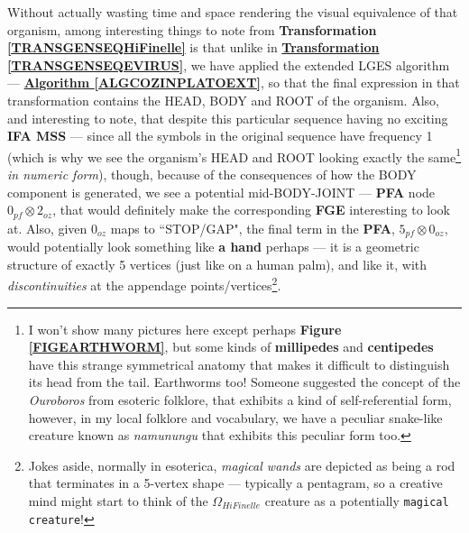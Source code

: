\documentclass[a4paper, 18pt]{book} %
\begin{document}
Without actually wasting time and space rendering the visual equivalence of that organism, among interesting things to note from \textbf{Transformation \ref{TRANSGENSEQHiFinelle}} is that unlike in \textbf{\hyperref[TRANSGENSEQEVIRUS]{Transformation \ref{TRANSGENSEQEVIRUS}}}, we have applied the extended LGES algorithm --- \textbf{\hyperref[ALGCOZINPLATOEXT]{Algorithm \ref{ALGCOZINPLATOEXT}}}, so that the final expression in that transformation contains the HEAD, BODY and ROOT of the organism. Also, and interesting to note, that despite this particular sequence having no exciting \textbf{IFA MSS} --- since all the symbols in the original sequence have frequency 1 (which is why we see the organism's HEAD and ROOT looking exactly the same\footnote{I won't show many pictures here except perhaps \textbf{Figure \ref{FIGEARTHWORM}}, but some kinds of \textbf{millipedes} and \textbf{centipedes} have this strange symmetrical anatomy that makes it difficult to distinguish its head from the tail. Earthworms too! Someone suggested the concept of the \textit{Ouroboros} from esoteric folklore, that exhibits a kind of self-referential form, however, in my local folklore and vocabulary, we have a peculiar snake-like creature known as \textit{namunungu} that exhibits this peculiar form too.} \textit{in numeric form}), though, because of the consequences of how the BODY component is generated, we see a potential mid-BODY-JOINT --- \textbf{PFA} node $0_{pf} \otimes 2_{oz}$, that would definitely make the corresponding \textbf{FGE} interesting to look at. Also, given $0_{oz}$ maps to ``STOP/GAP", the final term in the \textbf{PFA}, $5_{pf} \otimes 0_{oz}$, would potentially look something like \textbf{a hand} perhaps --- it is a geometric structure of exactly 5 vertices (just like on a human palm), and like it, with \textit{discontinuities} at the appendage points/vertices\footnote{Jokes aside, normally in esoterica, \textit{magical wands} are depicted as being a rod that terminates in a 5-vertex shape --- typically a pentagram, so a creative mind might start to think of the $\Omega_{HiFinelle}$ creature as a potentially \texttt{magical creature}!}. 
\end{document}
